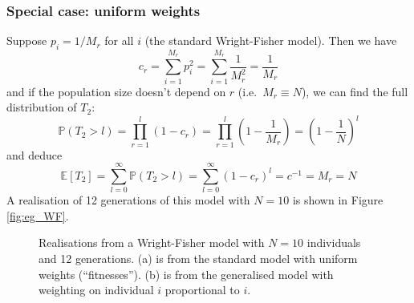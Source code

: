 \documentclass{article}
\newcommand{\E}{\mathbb{E}}
\newcommand{\PR}{\mathbb{P}}
\begin{document}
\subsubsection*{Special case: uniform weights}
Suppose $p_i = 1/M_r$ for all $i$ (the standard Wright-Fisher model).
Then we have
\begin{equation*}
c_r = \sum_{i=1}^{M_r} p_i^2 = \sum_{i=1}^{M_r} \frac{1}{M_r^2} = \frac{1}{M_r} 
\end{equation*}
and if the population size doesn't depend on $r$ (i.e.\ $M_r \equiv N$), we can find the full distribution of $T_2$:
\begin{equation*}
\PR(T_2 >l) = \prod_{r=1}^{l} (1-c_r) = \prod_{r=1}^l \left(1- \frac{1}{M_r}\right) = \left(1 - \frac{1}{N}\right)^l
\end{equation*}
and deduce
\begin{equation*}
\E [T_2] = \sum_{l=0}^\infty \PR(T_2 >l) = \sum_{l=0}^\infty (1-c_r)^l = c^{-1} = M_r = N
\end{equation*}
A realisation of 12 generations of this model with $N=10$ is shown in Figure \ref{fig:eg_WF}.
\begin{figure}
\centering
{}
\caption{Realisations from a Wright-Fisher model with $N=10$ individuals and 12 generations. (a) is from the standard model with uniform weights (``fitnesses''). (b) is from the generalised model with weighting on individual $i$ proportional to $i$.}
\end{figure}
\end{document}
